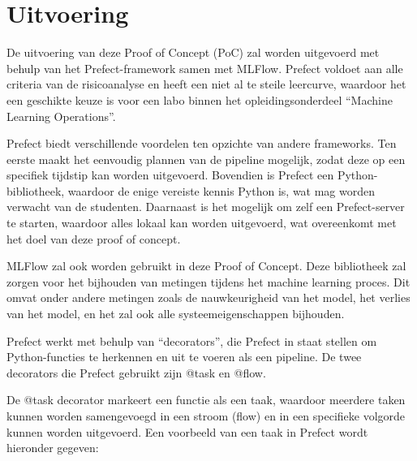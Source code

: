\section{Uitvoering}
De uitvoering van deze Proof of Concept (PoC) zal worden uitgevoerd met behulp van het Prefect-framework samen met MLFlow. Prefect voldoet aan alle criteria van de risicoanalyse en heeft een niet al te steile leercurve, waardoor het een geschikte keuze is voor een labo binnen het opleidingsonderdeel ``Machine Learning Operations''.

Prefect biedt verschillende voordelen ten opzichte van andere frameworks. Ten eerste maakt het eenvoudig plannen van de pipeline mogelijk, zodat deze op een specifiek tijdstip kan worden uitgevoerd. Bovendien is Prefect een Python-bibliotheek, waardoor de enige vereiste kennis Python is, wat mag worden verwacht van de studenten. Daarnaast is het mogelijk om zelf een Prefect-server te starten, waardoor alles lokaal kan worden uitgevoerd, wat overeenkomt met het doel van deze proof of concept.

MLFlow zal ook worden gebruikt in deze Proof of Concept. Deze bibliotheek zal zorgen voor het bijhouden van metingen tijdens het machine learning proces. Dit omvat onder andere metingen zoals de nauwkeurigheid van het model, het verlies van het model, en het zal ook alle systeemeigenschappen bijhouden.

Prefect werkt met behulp van ``decorators'', die Prefect in staat stellen om Python-functies te herkennen en uit te voeren als een pipeline. De twee decorators die Prefect gebruikt zijn @task en @flow.

De @task decorator markeert een functie als een taak, waardoor meerdere taken kunnen worden samengevoegd in een stroom (flow) en in een specifieke volgorde kunnen worden uitgevoerd. Een voorbeeld van een taak in Prefect wordt hieronder gegeven:



